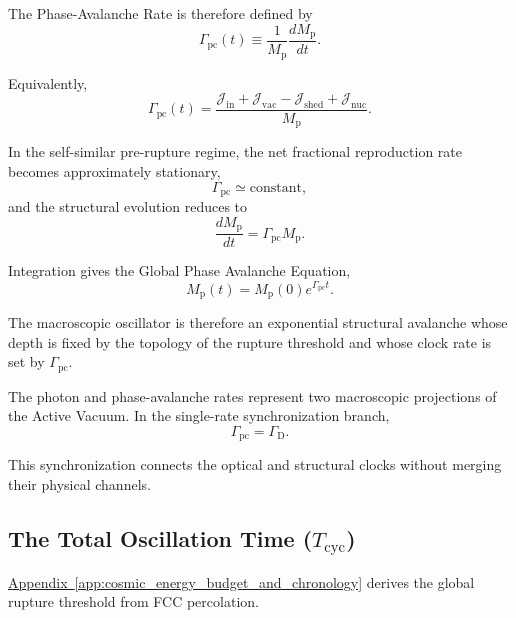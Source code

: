 The Phase-Avalanche Rate is therefore defined by
\begin{equation}
    \Gamma_{\mathrm{pc}}(t)
    \equiv
    \frac{1}{M_{\mathrm p}}
    \frac{dM_{\mathrm p}}{dt}.
\end{equation}

Equivalently,
\begin{equation}
    \Gamma_{\mathrm{pc}}(t)
    =
    \frac{
        \mathcal J_{\mathrm{in}}
        +
        \mathcal J_{\mathrm{vac}}
        -
        \mathcal J_{\mathrm{shed}}
        +
        \mathcal J_{\mathrm{nuc}}
    }{
        M_{\mathrm p}
    }.
\end{equation}

In the self-similar pre-rupture regime, the net fractional reproduction rate becomes approximately stationary,
\begin{equation}
    \Gamma_{\mathrm{pc}}
    \simeq
    \mathrm{constant},
\end{equation}
and the structural evolution reduces to
\begin{equation}
    \frac{dM_{\mathrm p}}{dt}
    =
    \Gamma_{\mathrm{pc}}M_{\mathrm p}.
\end{equation}

Integration gives the Global Phase Avalanche Equation,
\begin{equation}
    M_{\mathrm p}(t)
    =
    M_{\mathrm p}(0)
    e^{\Gamma_{\mathrm{pc}}t}.
\end{equation}

The macroscopic oscillator is therefore an exponential structural avalanche whose depth is fixed by the topology of the rupture threshold and whose clock rate is set by $\Gamma_{\mathrm{pc}}$.

The photon and phase-avalanche rates represent two macroscopic projections of the Active Vacuum. In the single-rate synchronization branch,
\begin{equation}
    \Gamma_{\mathrm{pc}}
    =
    \Gamma_{\mathrm D}.
\end{equation}

This synchronization connects the optical and structural clocks without merging their physical channels.


\subsection{The Total Oscillation Time ($T_{\mathrm{cyc}}$)}
\label{sec:total_oscillation_time}

\hyperref[app:cosmic_energy_budget_and_chronology]{Appendix~\ref*{app:cosmic_energy_budget_and_chronology}} derives the global rupture threshold from FCC percolation.

